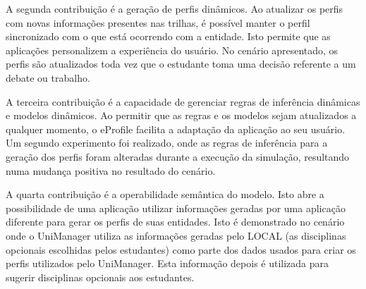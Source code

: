 A segunda contribuição é a geração de perfis dinâmicos. Ao atualizar os perfis com novas informações presentes nas trilhas, é possível manter o perfil sincronizado com o que está ocorrendo com a entidade. Isto permite que as aplicações personalizem a experiência do usuário. No cenário apresentado, os perfis são atualizados toda vez que o estudante toma uma decisão referente a um debate ou trabalho.

A terceira contribuição é a capacidade de gerenciar regras de inferência dinâmicas e modelos dinâmicos. Ao permitir que as regras e os modelos sejam atualizados a qualquer momento, o eProfile facilita a adaptação da aplicação ao seu usuário. Um segundo experimento foi realizado, onde as regras de inferência para a geração dos perfis foram alteradas durante a execução da simulação, resultando numa mudança positiva no resultado do cenário.

A quarta contribuição é a operabilidade semântica do modelo. Isto abre a possibilidade de uma aplicação utilizar informações geradas por uma aplicação diferente para gerar os perfis de suas entidades. Isto é demonstrado no cenário onde o UniManager utiliza as informações geradas pelo LOCAL (as disciplinas opcionais escolhidas pelos estudantes) como parte dos dados usados para criar os perfis utilizados pelo UniManager. Esta informação depois é utilizada para sugerir disciplinas opcionais aos estudantes.
